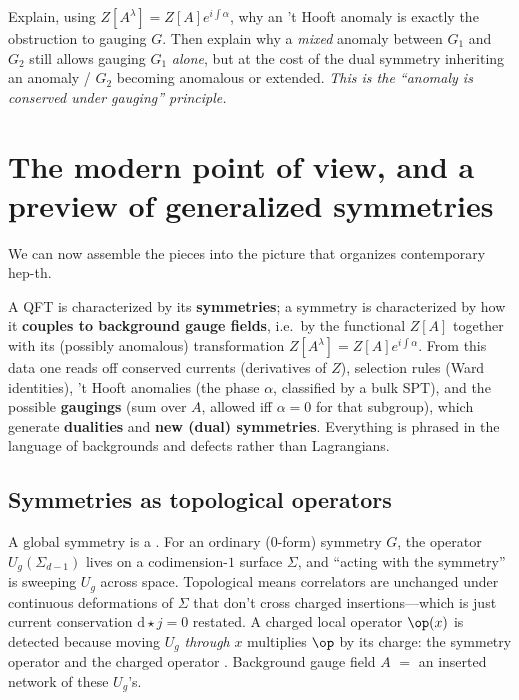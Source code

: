 \documentclass[11pt]{article}
\newcommand{\dd}{\mathrm{d}}                 %
\begin{document}
\begin{xca}
Explain, using $Z[A^\lambda]=Z[A]e^{i\int\alpha}$, why an 't Hooft anomaly is exactly
the obstruction to gauging $G$. Then explain why a \emph{mixed} anomaly between $G_1$
and $G_2$ still allows gauging $G_1$ \emph{alone}, but at the cost of the dual symmetry
inheriting an anomaly / $G_2$ becoming anomalous or extended. \emph{This is the
``anomaly is conserved under gauging'' principle.}
\end{xca}

\section{The modern point of view, and a preview of generalized symmetries}
\label{sec:higherform}

We can now assemble the pieces into the picture that organizes contemporary hep-th.

\begin{eequation}
A QFT is characterized by its \textbf{symmetries}; a symmetry is characterized by how it
\textbf{couples to background gauge fields}, i.e.\ by the functional $Z[A]$ together with
its (possibly anomalous) transformation $Z[A^\lambda]=Z[A]e^{i\int\alpha}$. From this
data one reads off conserved currents (derivatives of $Z$), selection rules (Ward
identities), 't Hooft anomalies (the phase $\alpha$, classified by a bulk SPT), and the
possible \textbf{gaugings} (sum over $A$, allowed iff $\alpha=0$ for that subgroup),
which generate \textbf{dualities} and \textbf{new (dual) symmetries}. Everything is
phrased in the language of backgrounds and defects rather than Lagrangians.
\end{eequation}

\subsection{Symmetries as topological operators}

\begin{iidea}
A global symmetry is a . For an ordinary ($0$-form)
symmetry $G$, the operator $U_g(\Sigma_{d-1})$ lives on a codimension-$1$ surface
$\Sigma$, and ``acting with the symmetry'' is sweeping $U_g$ across space. Topological
means correlators are unchanged under continuous deformations of $\Sigma$ that don't
cross charged insertions---which is just current conservation $\dd\star j=0$ restated.
A charged local operator $\op(x)$ is detected because moving $U_g$ \emph{through} $x$
multiplies $\op$ by its charge: the symmetry operator and the charged operator
. Background gauge field $A$ $=$ an inserted network of these $U_g$'s.
\end{iidea}
\end{document}
